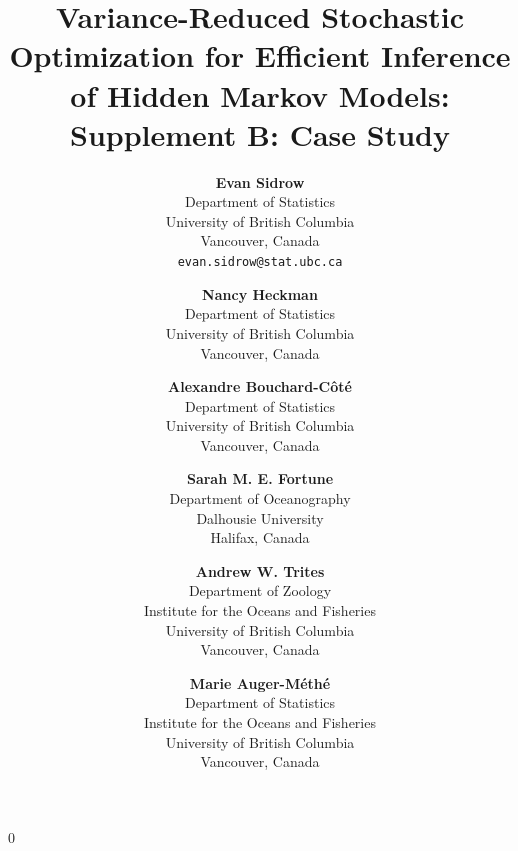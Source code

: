 \documentclass[12pt]{article}
\newcommand{\blind}{0}
\begin{document}
%

\def\spacingset#1{\renewcommand{\baselinestretch}%
{#1}\small\normalsize} \spacingset{1}


\blind
{
    \title{Variance-Reduced Stochastic Optimization for Efficient Inference of Hidden Markov Models: Supplement B: Case Study}

    \author{
      \textbf{Evan Sidrow} \\
      Department of Statistics \\
      University of British Columbia\\
      Vancouver, Canada \\
      \texttt{evan.sidrow@stat.ubc.ca} \\
      \and
      \textbf{Nancy Heckman} \\
      Department of Statistics \\
      University of British Columbia \\
      Vancouver, Canada \\
      \and
      \textbf{Alexandre Bouchard-C\^ot\'e} \\
      Department of Statistics \\
      University of British Columbia \\
      Vancouver, Canada \\
      \and
      \textbf{Sarah M. E. Fortune} \\
      Department of Oceanography \\
      Dalhousie University \\
      Halifax, Canada \\
      \and
      \textbf{Andrew W. Trites} \\
      Department of Zoology \\
      Institute for the Oceans and Fisheries \\
      University of British Columbia \\
      Vancouver, Canada \\
      \and
      \textbf{Marie Auger-M\'eth\'e} \\
      Department of Statistics \\
      Institute for the Oceans and Fisheries \\
      University of British Columbia \\
      Vancouver, Canada \\
    }
    \maketitle
} \fi
\end{document}

